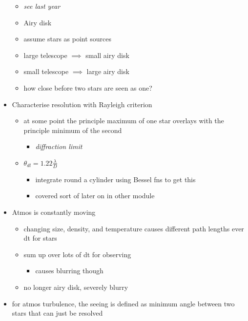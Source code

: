 \documentclass[a4paper,11pt,normalem]{article}
\begin{document}
\begin{itemize}
        \begin{itemize}
            \item \emph{see last year}
            \item Airy disk
            \item assume stars as point sources
            \item large telescope \(\implies\) small airy disk
            \item small telescope \(\implies\) large airy disk
            \item how close before two stars are seen as one?
        \end{itemize}
    \item Characterise resolution with Rayleigh criterion
        \begin{itemize}
            \item at some point the principle maximum of one star overlays with the principle minimum of the second
                \begin{itemize}
                    \item \emph{diffraction limit}
                \end{itemize}
            \item \(\theta_{dl} = 1.22\frac{\lambda}{D}\)
                \begin{itemize}
                    \item integrate round a cylinder using Bessel fns to get this
                    \item covered sort of later on in other module
                \end{itemize}
        \end{itemize}
    \item Atmos is constantly moving
        \begin{itemize}
            \item changing size, density, and temperature causes different path lengths ever dt for stars
            \item sum up over lots of dt for observing
                \begin{itemize}
                    \item causes blurring though
                \end{itemize}
            \item no longer airy disk, severely blurry
        \end{itemize}
    \item for atmos turbulence, the seeing is defined as minimum angle between two stars that can just be resolved

\end{itemize}
\end{document}
